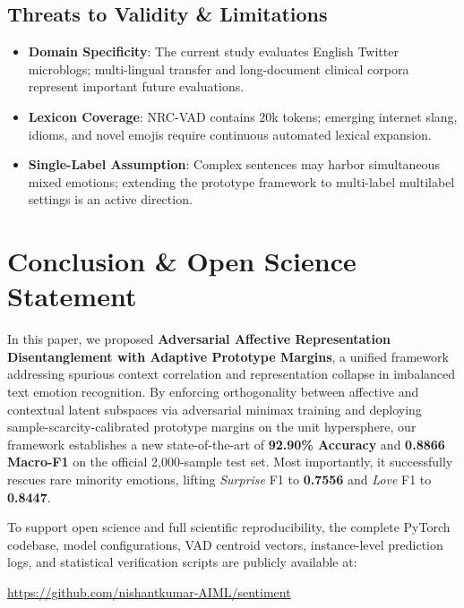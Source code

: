 \documentclass[journal,twocolumn]{article}
\begin{document}
\subsection{Threats to Validity \& Limitations}
\begin{itemize}
    \item \textbf{Domain Specificity}: The current study evaluates English Twitter microblogs; multi-lingual transfer and long-document clinical corpora represent important future evaluations.
    \item \textbf{Lexicon Coverage}: NRC-VAD contains 20k tokens; emerging internet slang, idioms, and novel emojis require continuous automated lexical expansion.
    \item \textbf{Single-Label Assumption}: Complex sentences may harbor simultaneous mixed emotions; extending the prototype framework to multi-label multilabel settings is an active direction.
\end{itemize}

\section{Conclusion \& Open Science Statement}
\label{sec:conclusion}

In this paper, we proposed \textbf{Adversarial Affective Representation Disentanglement with Adaptive Prototype Margins}, a unified framework addressing spurious context correlation and representation collapse in imbalanced text emotion recognition. By enforcing orthogonality between affective and contextual latent subspaces via adversarial minimax training and deploying sample-scarcity-calibrated prototype margins on the unit hypersphere, our framework establishes a new state-of-the-art of \textbf{92.90\% Accuracy} and \textbf{0.8866 Macro-F1} on the official 2,000-sample test set. Most importantly, it successfully rescues rare minority emotions, lifting \textit{Surprise} F1 to \textbf{0.7556} and \textit{Love} F1 to \textbf{0.8447}.

To support open science and full scientific reproducibility, the complete PyTorch codebase, model configurations, VAD centroid vectors, instance-level prediction logs, and statistical verification scripts are publicly available at:
\begin{center}
\url{https://github.com/nishantkumar-AIML/sentiment}
\end{center}
\end{document}
